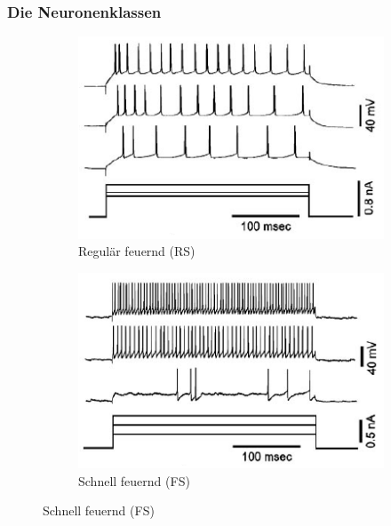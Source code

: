 \begin{frame}
  \frametitle{Die Neuronenklassen}
  \scriptsize
  \begin{figure}
    \begin{subfigure}{.5\textwidth}
      \centering
      \includegraphics*[width=0.7\linewidth]{genetic/nowak-rs.png}
      \caption*{Regulär feuernd (RS)}
    \end{subfigure}%
    \begin{subfigure}{.5\textwidth}
      \centering
      \includegraphics*[width=0.7\linewidth]{genetic/nowak-fs.png}
      \caption*{Schnell feuernd (FS)}
    \end{subfigure}
  \end{figure}


\end{frame}
